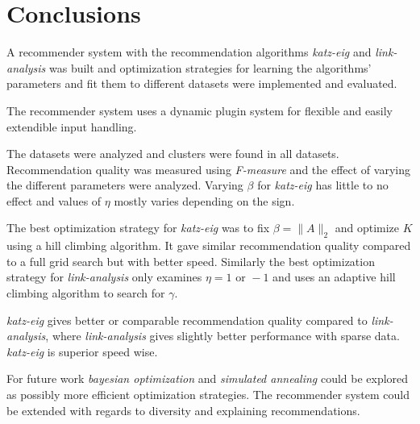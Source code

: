 \chapter{Conclusions}\label{cha:conclusions}

A recommender system with the recommendation algorithms \textit{katz-eig} and \textit{link-analysis} was built and optimization strategies for learning the algorithms' parameters and fit them to different datasets were implemented and evaluated.

The recommender system uses a dynamic plugin system for flexible and easily extendible input handling.

The datasets were analyzed and clusters were found in all datasets. Recommendation quality was measured using \textit{F-measure} and the effect of varying the different parameters were analyzed.  Varying $\beta$ for \textit{katz-eig} has little to no effect and values of $\eta$ mostly varies depending on the sign.

The best optimization strategy for \textit{katz-eig} was to fix $\beta = \| A \|_2$ and optimize $K$ using a hill climbing algorithm. It gave similar recommendation quality compared to a full grid search but with better speed. Similarly the best optimization strategy for \textit{link-analysis} only examines $\eta = 1 \text{ or } -1$ and uses an adaptive hill climbing algorithm to search for $\gamma$.

\textit{katz-eig} gives better or comparable recommendation quality compared to \textit{link-analysis}, where \textit{link-analysis} gives slightly better performance with sparse data. \textit{katz-eig} is superior speed wise.

For future work \textit{bayesian optimization} and \textit{simulated annealing} could be explored as possibly more efficient optimization strategies.  The recommender system could be extended with regards to diversity and explaining recommendations.

